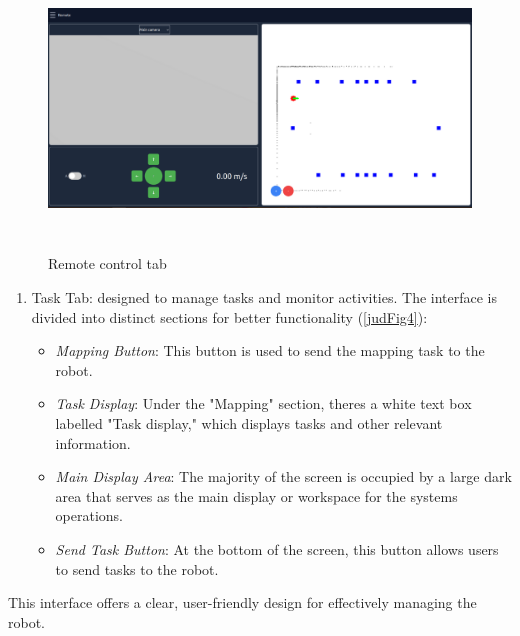 \documentclass[a4paper,12pt]{extreport}
\begin{document}
    \begin{figure}
    \centering
    \includegraphics[width=6.26806in,height=2.95694in]{img/image005.png}
    \caption{Remote control tab}
    \label{judFig3}
    \end{figure}
    
    \begin{enumerate}
    \def\labelenumi{\arabic{enumi}.}
    \setcounter{enumi}{2}
    \item
      Task Tab: designed to manage tasks and monitor activities. The
      interface is divided into distinct sections for better functionality
      (\cref{judFig4}):
    
      \begin{itemize}
      \item
        \emph{Mapping Button}: This button is used to send the mapping task
        to the robot.
      \item
        \emph{Task Display}: Under the "Mapping" section,
        there\textquotesingle s a white text box labelled "Task display,"
        which displays tasks and other relevant information.
      \item
        \emph{Main Display Area}: The majority of the screen is occupied by
        a large dark area that serves as the main display or workspace for
        the system\textquotesingle s operations.
      \item
        \emph{Send Task Button}: At the bottom of the screen, this button
        allows users to send tasks to the robot.
      \end{itemize}
    \end{enumerate}
    
    This interface offers a clear, user-friendly design for effectively
    managing the robot.
    
\end{document}
